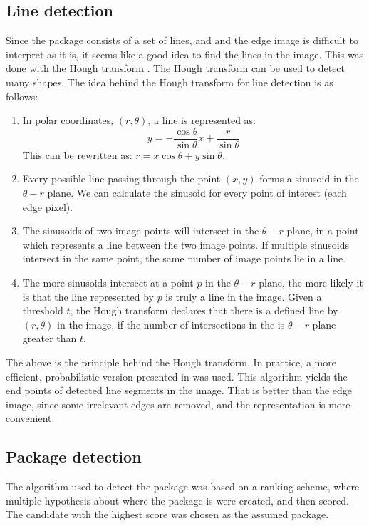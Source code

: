 %
\subsection{Line detection} %
Since the package consists of a set of lines, and and the edge image is difficult to interpret as it is, it seems like a good idea to find the lines in the image.
This was done with the Hough transform \cite{illingworth1988survey}.
The Hough transform can be used to detect many shapes.
The idea behind the Hough transform for line detection is as follows:
\begin{enumerate}
	\item In polar coordinates, $(r, \theta)$, a line is represented as: $$y = -\frac{\cos \theta}{\sin \theta} x + \frac{r}{\sin \theta}$$ This can be rewritten as: $r = x \cos \theta + y \sin \theta$. 
	\item Every possible line passing through the point $(x,y)$ forms a sinusoid in the $\theta - r$ plane. We can calculate the sinusoid for every point of interest (each edge pixel).
	\item The sinusoids of two image points will intersect in the $\theta - r$ plane, in a point which represents a line between the two image points. If multiple sinusoids intersect in the same point, the same number of image points lie in a line.
	\item The more sinusoids intersect at a point $p$ in the $\theta - r$ plane, the more likely it is that the line represented by $p$ is truly a line in the image. Given a threshold $t$, the Hough transform declares that there is a defined line by $(r, \theta)$ in the image, if the number of intersections in the is $\theta - r$ plane greater than $t$.
\end{enumerate}
The above is the principle behind the Hough transform.
In practice, a more efficient, probabilistic version presented in \cite{houghp} was used. 
This algorithm yields the end points of detected line segments in the image.
That is better than the edge image, since some irrelevant edges are removed, and the representation is more convenient.

\subsection{Package detection}
The algorithm used to detect the package was based on a ranking scheme, where multiple hypothesis about where the package is were created, and then scored. 
The candidate with the highest score was chosen as the assumed package. 

